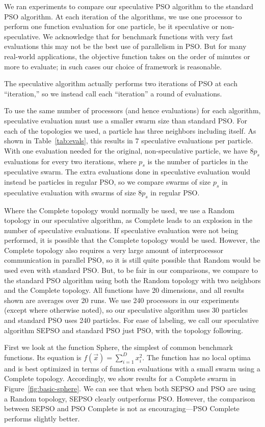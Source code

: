 \documentclass[journal,letterpaper]{IEEEtran}
\newcommand{\fig}[1]{Figure~\ref{fig:#1}}
\begin{document}
We ran experiments to compare our speculative PSO algorithm to the standard PSO
algorithm.  At each iteration of the algorithms, we use one processor to
perform one function evaluation for one particle, be it speculative or
non-speculative.  We acknowledge that for benchmark functions with very fast
evaluations this may not be the best use of parallelism in PSO.  But for many
real-world applications, the objective function takes on the order of minutes
or more to evaluate; in such cases our choice of framework is reasonable.

The speculative algorithm actually performs two iterations of PSO at each
``iteration,'' so we instead call each ``iteration'' a round of evaluations.

To use the same number of processors (and hence evaluations) for each
algorithm, speculative evaluation must use a smaller swarm size than standard
PSO.  For each of the topologies we used, a particle has three neighbors
including itself.  As shown in Table~\ref{tab:evals}, this results in $7$
speculative evaluations per particle.  With one evaluation needed for the
original, non-speculative particle, we have $8p_s$ evaluations for every two
iterations, where $p_s$ is the number of particles in the speculative swarm.
The extra evaluations done in speculative evaluation would instead be particles
in regular PSO, so we compare swarms of size $p_s$ in speculative evaluation
with swarms of size $8p_s$ in regular PSO.

Where the Complete topology would normally be used, we use a Random topology in
our speculative algorithm, as Complete leads to an explosion in the number of
speculative evaluations.  If speculative evaluation were not being performed,
it is possible that the Complete topology would be used.  However, the Complete
topology also requires a very large amount of interprocessor communication in
parallel PSO, so it is still quite possible that Random would be used even with
standard PSO.  But, to be fair in our comparisons, we compare to the standard
PSO algorithm using both the Random topology with two neighbors and the
Complete topology.  All functions have 20 dimensions, and all results shown are
averages over 20 runs.  We use 240 processors in our experiments (except where
otherwise noted), so our speculative algorithm uses 30 particles and standard
PSO uses 240 particles.  For ease of labeling, we call our speculative
algorithm SEPSO and standard PSO just PSO, with the topology following.

First we look at the function Sphere, the simplest of common benchmark
functions.  Its equation is $f(\Vec{x}) = \sum_{i=1}^D x_i^2$.  The function
has no local optima and is best optimized in terms of function evaluations with
a small swarm using a Complete topology.  Accordingly, we show results for a
Complete swarm in \fig{basic-sphere}.  We can see that when both SEPSO and PSO
are using a Random topology, SEPSO clearly outperforms PSO.  However, the
comparison between SEPSO and PSO Complete is not as encouraging---PSO Complete
performs slightly better.
\end{document}
